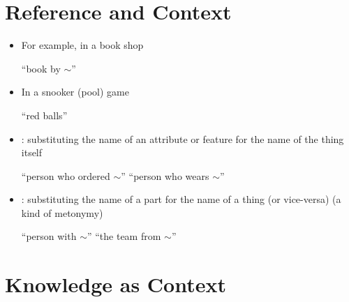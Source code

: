 \documentclass[headrule,footrule]{foils}
\begin{document}
\section{Reference and Context}
\MyLogo{}




\begin{itemize}%
\item For example, in a book shop
  \begin{exe}
    \ex {} \textnormal{``book by $\sim$''}
  \end{exe}
\item In a snooker (pool)  game
  \begin{exe}
    \ex {} ``red balls''
  \end{exe}
\end{itemize}
\newpage
{}

\begin{itemize}
\item {}: substituting the name of an attribute or feature for the name of the thing itself
  \begin{exe}
    \ex {} ``person who ordered $\sim$''
    \ex {} ``person who wears $\sim$''
  \end{exe}
  \item {}: substituting the name of a part for the name of a thing (or vice-versa)
    (a kind of metonymy)
  \begin{exe}
    \ex {} ``person with $\sim$''
    \ex {} ``the team from $\sim$''
  \end{exe}
\end{itemize}

\section{Knowledge as Context}
\end{document}

